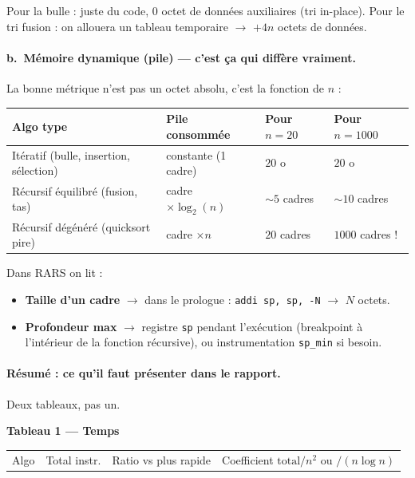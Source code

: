 \documentclass[11pt,a4paper]{article}
\begin{document}
Pour la bulle : juste du code, $0$ octet de données auxiliaires (tri in-place).
Pour le tri fusion : on allouera un tableau temporaire $\rightarrow$ $+4n$ octets de données.

\paragraph{b.~Mémoire dynamique (pile) --- c'est ça qui diffère vraiment.}

La bonne métrique n'est pas un octet absolu, c'est la fonction de $n$ :

\begin{table}[h]
\centering
\begin{tabular}{p{6cm} p{4cm} p{2.5cm} p{3cm}}
\toprule
\textbf{Algo type} & \textbf{Pile consommée} & \textbf{Pour $n=20$} & \textbf{Pour $n=1000$} \\
\midrule
Itératif (bulle, insertion, sélection) & constante (1 cadre) & $20$ o    & $20$ o \\
Récursif équilibré (fusion, tas)       & cadre $\times \log_2(n)$ & $\sim 5$ cadres & $\sim 10$ cadres \\
Récursif dégénéré (quicksort pire)     & cadre $\times n$    & $20$ cadres & $1000$ cadres ! \\
\bottomrule
\end{tabular}
\end{table}

Dans RARS on lit :
\begin{itemize}
    \item \textbf{Taille d'un cadre} $\rightarrow$ dans le prologue : \texttt{addi sp, sp, -N} $\rightarrow$ $N$ octets.
    \item \textbf{Profondeur max} $\rightarrow$ registre \texttt{sp} pendant l'exécution (breakpoint à l'intérieur de la fonction récursive), ou instrumentation \texttt{sp\_min} si besoin.
\end{itemize}

\paragraph{Résumé : ce qu'il faut présenter dans le rapport.}

Deux tableaux, pas un.

\textbf{Tableau 1 --- Temps}
\begin{center}
\begin{tabular}{llll}
Algo & Total instr. & Ratio vs plus rapide & Coefficient $\text{total} / n^2$ ou $/ (n \log n)$ \\
\end{tabular}
\end{center}
\end{document}
